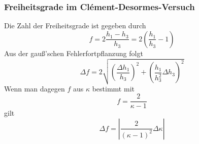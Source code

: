 \subsubsection{Freiheitsgrade im Clément-Desormes-Versuch}
Die Zahl der Freiheitsgrade ist gegeben durch
\begin{equation*}
	f = 2\frac{h_1 - h_3}{h_3} = 2\left(\frac{h_1}{h_3} - 1\right)
\end{equation*}
Aus der gauß'schen Fehlerfortpflanzung folgt
\begin{equation}
	\Delta f = 2\sqrt{\left(\frac{\Delta h_1}{h_3}\right)^2 + \left(\frac{h_1}{h_3^2}\Delta h_3\right)^2} \label{eq:err_f}
\end{equation}
Wenn man dagegen $ f $ aus $ \kappa $ bestimmt mit \begin{equation*}
	f = \frac{2}{\kappa-1}
\end{equation*}
gilt
\begin{equation}
\Delta f = \left|\frac{2}{(\kappa-1)^2}\Delta\kappa\right| \label{eq:err_f2}
\end{equation}

%
%
